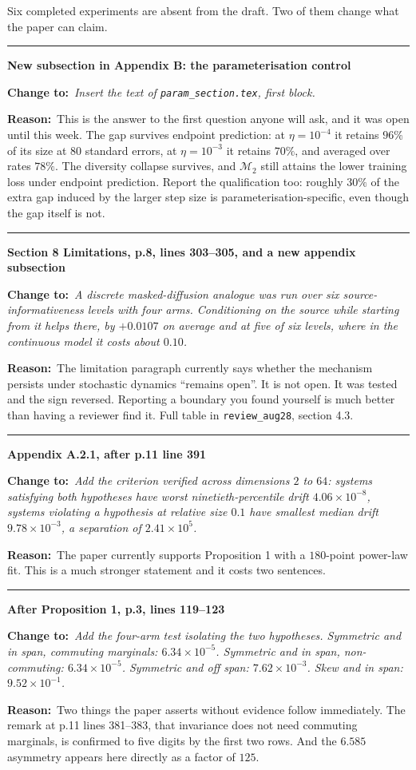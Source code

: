 \documentclass[11pt]{article}
\newcommand{\M}{\mathcal M}
\newcommand{\NEW}[1]{\medskip\noindent\textcolor{hd}{\rule{\textwidth}{0.6pt}}\par
  \noindent\textbf{#1}\par\smallskip}
\newcommand{\FIX}[1]{\noindent\textcolor{put}{\textbf{Change to:}}\ \begingroup\itshape #1\endgroup\par\smallskip}
\newcommand{\NOTE}[1]{\noindent\textbf{Reason:}\ #1\par}
\begin{document}
Six completed experiments are absent from the draft. Two of them change what the paper can claim.

\NEW{New subsection in Appendix B: the parameterisation control}
\FIX{Insert the text of \texttt{param\_section.tex}, first block.}
\NOTE{This is the answer to the first question anyone will ask, and it was open until this week.
The gap survives endpoint prediction: at $\eta=10^{-4}$ it retains $96\%$ of its size at $80$
standard errors, at $\eta=10^{-3}$ it retains $70\%$, and averaged over rates $78\%$. The
diversity collapse survives, and $\M_2$ still attains the lower training loss under endpoint
prediction. Report the qualification too: roughly $30\%$ of the extra gap induced by the larger
step size is parameterisation-specific, even though the gap itself is not.}

\NEW{Section 8 Limitations, p.8, lines 303--305, and a new appendix subsection}
\FIX{A discrete masked-diffusion analogue was run over six source-informativeness levels with
four arms. Conditioning on the source while starting from it \emph{helps} there, by $+0.0107$ on
average and at five of six levels, where in the continuous model it costs about $0.10$.}
\NOTE{The limitation paragraph currently says whether the mechanism persists under stochastic
dynamics ``remains open''. It is not open. It was tested and the sign reversed. Reporting a
boundary you found yourself is much better than having a reviewer find it. Full table in
\texttt{review\_aug28}, section 4.3.}

\NEW{Appendix A.2.1, after p.11 line 391}
\FIX{Add the criterion verified across dimensions $2$ to $64$: systems satisfying both hypotheses
have worst ninetieth-percentile drift $4.06\times10^{-8}$, systems violating a hypothesis at
relative size $0.1$ have smallest median drift $9.78\times10^{-3}$, a separation of
$2.41\times10^{5}$.}
\NOTE{The paper currently supports Proposition 1 with a $180$-point power-law fit. This is a much
stronger statement and it costs two sentences.}

\NEW{After Proposition 1, p.3, lines 119--123}
\FIX{Add the four-arm test isolating the two hypotheses. Symmetric and in span, commuting
marginals: $6.34\times10^{-5}$. Symmetric and in span, non-commuting: $6.34\times10^{-5}$.
Symmetric and off span: $7.62\times10^{-3}$. Skew and in span: $9.52\times10^{-1}$.}
\NOTE{Two things the paper asserts without evidence follow immediately. The remark at p.11 lines
381--383, that invariance does not need commuting marginals, is confirmed to five digits by the
first two rows. And the $6.585$ asymmetry appears here directly as a factor of $125$.}
\end{document}
